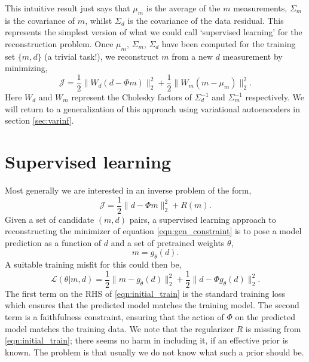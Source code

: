 \documentclass[12pt]{article}
\begin{document}
This intuitive result just says that $\mu_m$ is the average of the $m$ measurements, $\Sigma_m$ is the covariance of $m$, whilst $\Sigma_d$ is the covariance of the data residual. This represents the simplest version of what we could call `supervised learning' for the reconstruction problem. Once $\mu_m$, $\Sigma_m$, $\Sigma_d$ have been computed for the training set $\{m, d\}$ (a trivial task!), we reconstruct $m$ from a new $d$ measurement by minimizing,
\begin{equation}
\mathcal{J}=\frac{1}{2} \| W_d(d - \Phi m) \|_2^2 +\frac{1}{2} \|W_m(m-\mu_m)\|_2^2.\label{eqn:basic_recon}
\end{equation}
Here $W_d$ and $W_m$ represent the Cholesky factors of $\Sigma_d^{-1}$ and $\Sigma_m^{-1}$ respectively. We will return to a generalization of this approach using variational autoencoders in section \ref{sec:varinf}. 
\section{Supervised learning}\label{sec:learned}
Most generally we are interested in an inverse problem of the form,
\begin{equation}
\mathcal{J}=\frac{1}{2}\| d - \Phi m\|_2^2+R(m).\label{eqn:gen_constraint}
\end{equation}
Given a set of candidate ${(m, d)}$ pairs, a supervised learning approach to reconstructing the minimizer of equation \ref{eqn:gen_constraint} is to pose a model prediction as a function of $d$ and a set of pretrained weights $\theta$,
\begin{equation}
m=g_{\theta}(d).
\end{equation}
A suitable training misfit for this could then be,
\begin{equation}
\mathcal{L}(\theta| {m,d})=\frac{1}{2}\|m-g_{\theta}(d)\|_2^2+\frac{1}{2}\|d-\Phi g_{\theta}(d)\|_2^2. \label{eqn:initial_train}
\end{equation}
The first term on the RHS of \ref{eqn:initial_train} is the standard training loss which ensures that the predicted model matches the training model. The second term is a faithfulness constraint, ensuring that the action of $\Phi$ on the predicted model matches the training data.  We note that the regularizer $R$ is missing from \ref{eqn:initial_train}; there seems no harm in including it, if an effective prior is known. The problem is that usually we do not know what such a prior should be.
\end{document}
